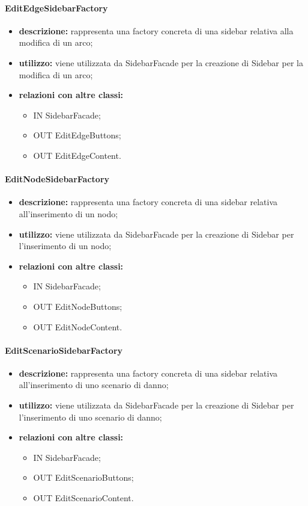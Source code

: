 \paragraph{EditEdgeSidebarFactory}
\begin{itemize}
	\item \textbf{descrizione:} rappresenta una factory concreta di una sidebar relativa alla modifica di un arco;
	\item \textbf{utilizzo:} viene utilizzata da SidebarFacade per la creazione di Sidebar per la modifica di un arco;
	\item \textbf{relazioni con altre classi:} 
	\begin{itemize}
		\item IN SidebarFacade;
		\item OUT EditEdgeButtons;
		\item OUT EditEdgeContent.
	\end{itemize}
\end{itemize}
\paragraph{EditNodeSidebarFactory}
\begin{itemize}
	\item \textbf{descrizione:} rappresenta una factory concreta di una sidebar relativa all'inserimento di un nodo;
	\item \textbf{utilizzo:} viene utilizzata da SidebarFacade per la creazione di Sidebar per l'inserimento di un nodo;
	\item \textbf{relazioni con altre classi:} 
	\begin{itemize}
		\item IN SidebarFacade;
		\item OUT EditNodeButtons;
		\item OUT EditNodeContent.
	\end{itemize}
\end{itemize}
\paragraph{EditScenarioSidebarFactory}
\begin{itemize}
	\item \textbf{descrizione:} rappresenta una factory concreta di una sidebar relativa all'inserimento di uno scenario di danno;
	\item \textbf{utilizzo:} viene utilizzata da SidebarFacade per la creazione di Sidebar per l'inserimento di uno scenario di danno;
	\item \textbf{relazioni con altre classi:} 
	\begin{itemize}
		\item IN SidebarFacade;
		\item OUT EditScenarioButtons;
		\item OUT EditScenarioContent.
	\end{itemize}
\end{itemize}
